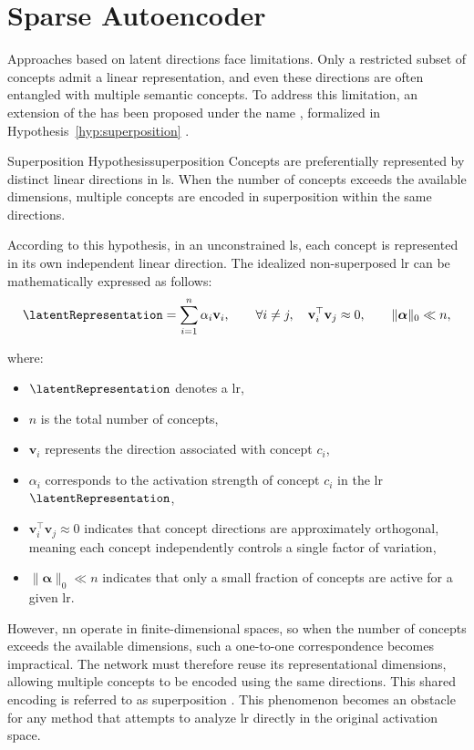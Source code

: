 \section{Sparse Autoencoder}
\label{sec:sparse_autoencoder}

Approaches based on latent directions face limitations.
Only a restricted subset of concepts admit a linear representation, and even these directions are often entangled with multiple semantic concepts.
To address this limitation, an extension of the \ConceptHypothesisName has been proposed under the name \SuperpositionHypothesisName, formalized in Hypothesis~\ref{hyp:superposition} \cite{elhage2022superposition}.

\begin{hypothesis}{Superposition Hypothesis}{superposition}
Concepts are preferentially represented by distinct linear directions in \gls{ls}.
When the number of concepts exceeds the available dimensions, multiple concepts are encoded in superposition within the same directions.
\end{hypothesis}

According to this hypothesis, in an unconstrained \gls{ls}, each concept is represented in its own independent linear direction.
The idealized non-superposed \gls{lr} can be mathematically expressed as follows:
\[
\latentRepresentation = \sum_{i=1}^{n} \alpha_i \mathbf{v}_i,
\qquad
\forall i \neq j,\quad \mathbf{v}_i^\top \mathbf{v}_j \approx 0,
\qquad
\|\boldsymbol{\alpha}\|_0 \ll n,
\]

where:
\begin{itemize}
    \item $\latentRepresentation$ denotes a \gls{lr},
    \item $n$ is the total number of concepts,
    \item $\mathbf{v}_i$ represents the direction associated with concept $c_i$,
    \item $\alpha_i$ corresponds to the activation strength of concept $c_i$ in the \gls{lr} $\latentRepresentation$,
    \item $\mathbf{v}_i^\top \mathbf{v}_j \approx 0$ indicates that concept directions are approximately orthogonal, meaning each concept independently controls a single factor of variation,
    \item $\|\boldsymbol{\alpha}\|_0 \ll n$ indicates that only a small fraction of concepts are active for a given \gls{lr}.
\end{itemize}

However, \gls{nn} operate in finite-dimensional spaces, so when the number of concepts exceeds the available dimensions, such a one-to-one correspondence becomes impractical.
The network must therefore reuse its representational dimensions, allowing multiple concepts to be encoded using the same directions.
This shared encoding is referred to as superposition \cite{bricken2023monosemanticity}.
This phenomenon becomes an obstacle for any method that attempts to analyze \gls{lr} directly in the original activation space.

